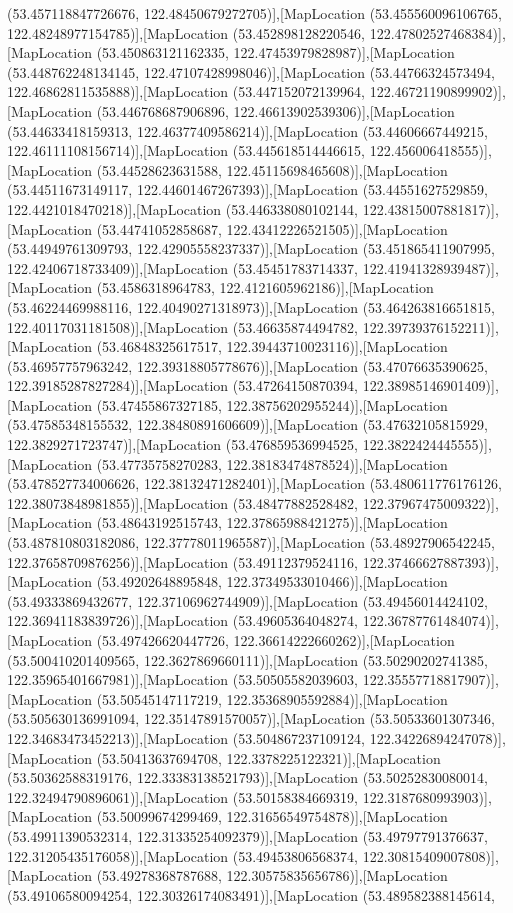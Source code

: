 (53.457118847726676, 122.48450679272705)],[MapLocation (53.455560096106765, 122.48248977154785)],[MapLocation (53.452898128220546, 122.47802527468384)],[MapLocation (53.450863121162335, 122.47453979828987)],[MapLocation (53.448762248134145, 122.47107428998046)],[MapLocation (53.44766324573494, 122.46862811535888)],[MapLocation (53.447152072139964, 122.46721190899902)],[MapLocation (53.446768687906896, 122.46613902539306)],[MapLocation (53.44633418159313, 122.46377409586214)],[MapLocation (53.44606667449215, 122.46111108156714)],[MapLocation (53.445618514446615, 122.456006418555)],[MapLocation (53.44528623631588, 122.45115698465608)],[MapLocation (53.44511673149117, 122.44601467267393)],[MapLocation (53.44551627529859, 122.4421018470218)],[MapLocation (53.446338080102144, 122.43815007881817)],[MapLocation (53.44741052858687, 122.43412226521505)],[MapLocation (53.44949761309793, 122.42905558237337)],[MapLocation (53.451865411907995, 122.42406718733409)],[MapLocation (53.45451783714337, 122.41941328939487)],[MapLocation (53.4586318964783, 122.4121605962186)],[MapLocation (53.46224469988116, 122.40490271318973)],[MapLocation (53.464263816651815, 122.40117031181508)],[MapLocation (53.46635874494782, 122.39739376152211)],[MapLocation (53.46848325617517, 122.39443710023116)],[MapLocation (53.46957757963242, 122.39318805778676)],[MapLocation (53.47076635390625, 122.39185287827284)],[MapLocation (53.47264150870394, 122.38985146901409)],[MapLocation (53.47455867327185, 122.38756202955244)],[MapLocation (53.47585348155532, 122.38480891606609)],[MapLocation (53.47632105815929, 122.3829271723747)],[MapLocation (53.476859536994525, 122.3822424445555)],[MapLocation (53.47735758270283, 122.38183474878524)],[MapLocation (53.478527734006626, 122.38132471282401)],[MapLocation (53.480611776176126, 122.38073848981855)],[MapLocation (53.48477882528482, 122.37967475009322)],[MapLocation (53.48643192515743, 122.37865988421275)],[MapLocation (53.487810803182086, 122.37778011965587)],[MapLocation (53.48927906542245, 122.37658709876256)],[MapLocation (53.49112379524116, 122.37466627887393)],[MapLocation (53.49202648895848, 122.37349533010466)],[MapLocation (53.49333869432677, 122.37106962744909)],[MapLocation (53.49456014424102, 122.36941183839726)],[MapLocation (53.49605364048274, 122.36787761484074)],[MapLocation (53.497426620447726, 122.36614222660262)],[MapLocation (53.500410201409565, 122.3627869660111)],[MapLocation (53.50290202741385, 122.35965401667981)],[MapLocation (53.50505582039603, 122.35557718817907)],[MapLocation (53.50545147117219, 122.35368905592884)],[MapLocation (53.505630136991094, 122.35147891570057)],[MapLocation (53.50533601307346, 122.34683473452213)],[MapLocation (53.504867237109124, 122.34226894247078)],[MapLocation (53.50413637694708, 122.3378225122321)],[MapLocation (53.50362588319176, 122.33383138521793)],[MapLocation (53.50252830080014, 122.32494790896061)],[MapLocation (53.50158384669319, 122.3187680993903)],[MapLocation (53.50099674299469, 122.31656549754878)],[MapLocation (53.49911390532314, 122.31335254092379)],[MapLocation (53.49797791376637, 122.31205435176058)],[MapLocation (53.49453806568374, 122.30815409007808)],[MapLocation (53.49278368787688, 122.30575835656786)],[MapLocation (53.49106580094254, 122.30326174083491)],[MapLocation (53.489582388145614, 